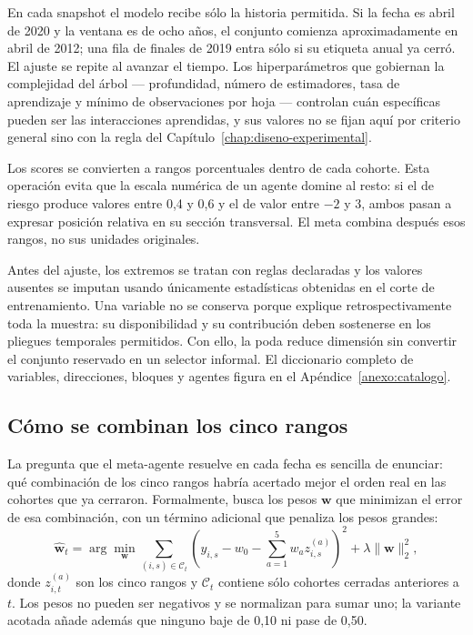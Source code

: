 En cada snapshot el modelo recibe sólo la historia permitida. Si la fecha es abril de 2020 y la
ventana es de ocho años, el conjunto comienza aproximadamente en abril de 2012; una fila de finales
de 2019 entra sólo si su etiqueta anual ya cerró. El ajuste se repite al avanzar el tiempo. Los
hiperparámetros que gobiernan la complejidad del árbol --- profundidad, número de estimadores, tasa
de aprendizaje y mínimo de observaciones por hoja --- controlan cuán específicas pueden ser las
interacciones aprendidas, y sus valores no se fijan aquí por criterio general sino con la regla del
Capítulo~\ref{chap:diseno-experimental}.

Los scores se convierten a rangos porcentuales dentro de cada cohorte. Esta operación evita que la
escala numérica de un agente domine al resto: si el de riesgo produce valores entre 0,4 y 0,6 y el
de valor entre $-2$ y $3$, ambos pasan a expresar posición relativa en su sección transversal.
El meta combina después esos rangos, no sus unidades originales.

Antes del ajuste, los extremos se tratan con reglas declaradas y los valores ausentes se imputan
usando únicamente estadísticas obtenidas en el corte de entrenamiento. Una variable no se conserva
porque explique retrospectivamente toda la muestra: su disponibilidad y su contribución deben
sostenerse en los pliegues temporales permitidos. Con ello, la poda reduce dimensión sin convertir
el conjunto reservado en un selector informal. El diccionario completo de variables, direcciones,
bloques y agentes figura en el Apéndice~\ref{anexo:catalogo}.

\subsection{Cómo se combinan los cinco rangos}

La pregunta que el meta-agente resuelve en cada fecha es sencilla de enunciar: qué combinación de
los cinco rangos habría acertado mejor el orden real en las cohortes que ya cerraron. Formalmente,
busca los pesos $\boldsymbol w$ que minimizan el error de esa combinación, con un término adicional
que penaliza los pesos grandes:
\[
 \widehat{\boldsymbol w}_t=
 \arg\min_{\boldsymbol w}
 \sum_{(i,s)\in\mathcal C_t}
 \left(y_{i,s}-w_0-\sum_{a=1}^{5}w_a z^{(a)}_{i,s}\right)^2
 +\lambda\lVert\boldsymbol w\rVert_2^2,
\]
donde $z^{(a)}_{i,t}$ son los cinco rangos y $\mathcal C_t$ contiene sólo cohortes cerradas
anteriores a $t$. Los pesos no pueden ser negativos y se normalizan para sumar uno; la variante
acotada añade además que ninguno baje de 0,10 ni pase de 0,50.

